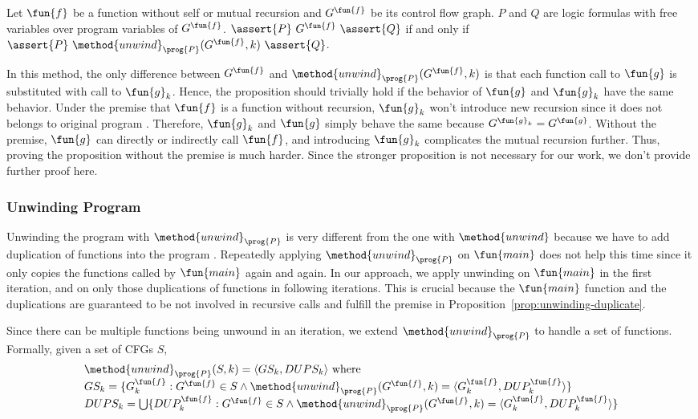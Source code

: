 \begin{proposition}\label{prop:unwinding-duplicate}
  Let $\fun{f}$ be a function without self or mutual recursion and 
  $G^\fun{f}$ be its control flow graph.
  $P$ and $Q$ are logic formulas with free variables over program variables of
  $G^\fun{f}$.
  $\assert{P}\ G^\fun{f}\ \assert{Q}$ if and only if 
  $\assert{P}\ \method{unwind}_\prog{P}(G^\fun{f}, k)\ \assert{Q}$.
\end{proposition}
In this method, the only difference between $G^\fun{f}$ and
$\method{unwind}_\prog{P}(G^\fun{f}, k)$ is that each function call to
$\fun{g}$ is substituted with call to $\fun{g}_k$.
Hence, the proposition should trivially hold if the behavior of $\fun{g}$ and
$\fun{g}_k$ have the same behavior.
Under the premise that $\fun{f}$ is a function without recursion,
$\fun{g}_k$ won't introduce new recursion since it does not belongs to original
program .
Therefore, $\fun{g}_k$ and $\fun{g}$ simply behave the same because 
$G^{\fun{g}_k} = G^\fun{g}$.
Without the premise, $\fun{g}$ can directly or indirectly call $\fun{f}$,
and introducing $\fun{g}_k$ complicates the mutual recursion further.
Thus, proving the proposition without the premise is much harder.
Since the stronger proposition is not necessary for our work,
we don't provide further proof here.

\subsubsection*{Unwinding Program}
Unwinding the program with $\method{unwind}_\prog{P}$ is very different from
the one with $\method{unwind}$ because we have to add duplication of functions
into the program .
Repeatedly applying $\method{unwind}_\prog{P}$ on $\fun{main}$ does not help
this time since it only copies the functions called by $\fun{main}$ again
and again.
In our approach, we apply unwinding on $\fun{main}$ in the first iteration,
and on only those duplications of functions in following iterations.
This is crucial because the $\fun{main}$ function and the duplications are
guaranteed to be not involved in recursive calls and fulfill the premise in
Proposition~\ref{prop:unwinding-duplicate}.

Since there can be multiple functions being unwound in an iteration, we extend
$\method{unwind}_\prog{P}$ to handle a set of functions.
Formally, given a set of CFGs $S$,
\[
\begin{array}{l}
\method{unwind}_\prog{P}(S, k) = \langle GS_k, DUPS_k \rangle \text{ where}\\
GS_k = \{G^\fun{f}_k : G^\fun{f} \in S
  \land \method{unwind}_\prog{P}(G^\fun{f}, k) 
        = \langle G^\fun{f}_k, DUP^\fun{f}_k \rangle
  \} \\
  
DUPS_k = \bigcup\{
  DUP^\fun{f}_k : G^\fun{f} \in S
  \land \method{unwind}_\prog{P}(G^\fun{f}, k) 
        = \langle G^\fun{f}_k, DUP^\fun{f}_k \rangle
  \} \\
\end{array}
\]

